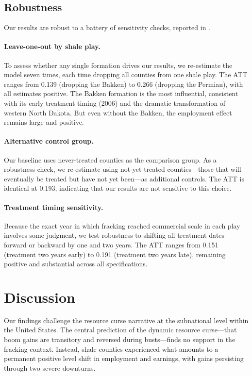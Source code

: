 \documentclass[12pt]{article}
\begin{document}
\subsection{Robustness}

Our results are robust to a battery of sensitivity checks, reported in .

\paragraph{Leave-one-out by shale play.} To assess whether any single formation drives our results, we re-estimate the model seven times, each time dropping all counties from one shale play. The ATT ranges from 0.139 (dropping the Bakken) to 0.266 (dropping the Permian), with all estimates positive. The Bakken formation is the most influential, consistent with its early treatment timing (2006) and the dramatic transformation of western North Dakota. But even without the Bakken, the employment effect remains large and positive.

\paragraph{Alternative control group.} Our baseline uses never-treated counties as the comparison group. As a robustness check, we re-estimate using not-yet-treated counties---those that will eventually be treated but have not yet been---as additional controls. The ATT is identical at 0.193, indicating that our results are not sensitive to this choice.

\paragraph{Treatment timing sensitivity.} Because the exact year in which fracking reached commercial scale in each play involves some judgment, we test robustness to shifting all treatment dates forward or backward by one and two years. The ATT ranges from 0.151 (treatment two years early) to 0.191 (treatment two years late), remaining positive and substantial across all specifications.




\section{Discussion}
\label{sec:discussion}

Our findings challenge the resource curse narrative at the subnational level within the United States. The central prediction of the dynamic resource curse---that boom gains are transitory and reversed during busts---finds no support in the fracking context. Instead, shale counties experienced what amounts to a permanent positive level shift in employment and earnings, with gains persisting through two severe downturns.
\end{document}
